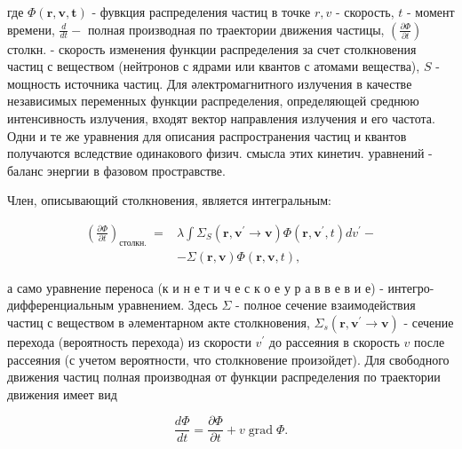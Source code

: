 \documentclass[10pt]{article}
\begin{document}
где $\Phi(\boldsymbol{r}, \boldsymbol{v}, \boldsymbol{t})$ - фувкция распределения частиц в точке $r, v$ - скорость, $t$ - момент времени, $\frac{d}{d t}-$ полная производная по траектории движения частицы, $\left(\frac{\partial \Phi}{\partial t}\right)$ столкн. - скорость изменения функции распределения за счет столкновения частиц с веществом (нейтронов с ядрами или квантов с атомами вещества), $S$ - мощность источника частиц. Для әлектромагнитного излучения в качестве независимых переменных функции распределения, определяющей среднюю интенсивность излучения, входят вектор направления излучения и его частота. Одни и те же уравнения для описания распространения частиц и квантов получаются вследствие одинакового физич. смысла этих кинетич. уравнений - баланс энергии в фазовом простравстве.



Член, описывающий столкновения, является интегральным:



\[

\begin{aligned}

\left(\frac{\partial \Phi}{\partial t}\right)_{\text {столкн. }}= & \lambda \int \Sigma_{S}\left(\boldsymbol{r}, \boldsymbol{v}^{\prime} \longrightarrow \boldsymbol{v}\right) \Phi\left(\boldsymbol{r}, \boldsymbol{v}^{\prime}, t\right) d v^{\prime}- \\

& -\Sigma(\boldsymbol{r}, \boldsymbol{v}) \Phi(\boldsymbol{r}, \boldsymbol{v}, t),

\end{aligned}

\]



а само уравнение переноса (к и н е т и ч е с к о е у р а в в е в и е) - интегро-дифференциальным уравнением. Здесь $\Sigma$ - полное сечение взаимодействия частиц с веществом в әлементарном акте столкновения, $\Sigma_{s}\left(\boldsymbol{r}, \boldsymbol{v}^{\prime} \rightarrow \boldsymbol{v}\right)$ - сечение перехода (вероятность перехода) из скорости $v^{\prime}$ до рассеяния в скорость $v$ после рассеяния (с учетом вероятности, что столкновение произойдет). Для свободного движения частиц полная производная от функции распределения по траектории движения имеет вид



\[

\frac{d \Phi}{d t}=\frac{\partial \Phi}{\partial t}+v \operatorname{grad} \Phi .

\]
\end{document}
